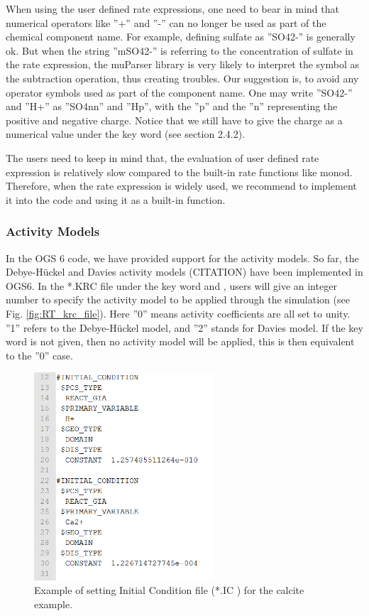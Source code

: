 When using the user defined rate expressions, one need to bear in mind that numerical operators like ''+'' and ''-'' can no longer be used as part of the chemical component name. For example, defining sulfate as ''SO42-'' is generally ok. But when the string ''mSO42-'' is referring to the concentration of sulfate in the rate expression, the muParser library is very likely to interpret the symbol as the subtraction operation, thus creating troubles. Our suggestion is, to avoid any operator symbols used as part of the component name. One may write ''SO42-'' and ''H+'' as ''SO4nn'' and ''Hp'', with the ''p'' and the ''n'' representing the positive and negative charge. Notice that we still have to give the charge as a numerical value under the  key word (see section 2.4.2). 

The users need to keep in mind that, the evaluation of user defined rate expression is relatively slow compared to the built-in rate functions like monod. Therefore, when the rate expression is widely used, we recommend to implement it into the code and using it as a built-in function. 

\subsubsection{Activity Models}

In the OGS 6 code, we have provided support for the activity models. So far, the Debye-H\"uckel and Davies activity models (CITATION) have been implemented in OGS6. In the *.KRC file under the key word  and , users will give an integer number to specify the activity model to be applied through the simulation (see Fig. \ref{fig:RT_krc_file}). Here ''0'' means activity coefficients are all set to unity. ''1'' refers to the Debye-H\"uckel model, and ''2'' stands for Davies model. If the key word  is not given, then no activity model will be applied, this is then equivalent to the ''0'' case. 

\begin{figure}
\includegraphics[width=0.6\textwidth]{RT/figs/RT_fig_ic_file}
\caption{Example of setting Initial Condition file (*.IC ) for the calcite example. }
\label{fig:RT_fig_ic_file}
\end{figure}


